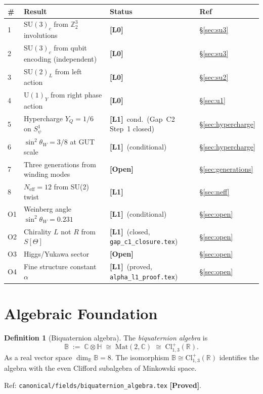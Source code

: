 \documentclass[12pt,a4paper]{article}
\theoremstyle{definition}
\newtheorem{definition}[theorem]{Definition}
\theoremstyle{remark}
\newcommand{\PROVED}{\textbf{[Proved]}}
\newcommand{\OPEN}{\textbf{[Open]}}
\newcommand{\SU}[1]{\mathrm{SU}(#1)}
\newcommand{\UU}[1]{\mathrm{U}(#1)}
\newcommand{\Bq}{\mathbb{C}\otimes\mathbb{H}}
\newcommand{\Lone}{\textbf{[L1]}}
\newcommand{\Lzero}{\textbf{[L0]}}
\begin{document}
\begin{center}
\begin{tabular}{llll}
\toprule
\textbf{\#} & \textbf{Result} & \textbf{Status} & \textbf{Ref} \\
\midrule
1 & $\SU{3}_c$ from $\mathbb{Z}_2^3$ involutions & \Lzero & §\ref{sec:su3} \\
2 & $\SU{3}_c$ from qubit encoding (independent) & \Lzero & §\ref{sec:su3} \\
3 & $\SU{2}_L$ from left action & \Lzero & §\ref{sec:su2} \\
4 & $\UU{1}_Y$ from right phase action & \Lzero & §\ref{sec:u1} \\
5 & Hypercharge $Y_Q = 1/6$ on $S^1_\psi$ & \Lone\ cond.\ (Gap~C2 Step~1 closed) & §\ref{sec:hypercharge} \\
6 & $\sin^2\theta_W = 3/8$ at GUT scale & \Lone\ (conditional) & §\ref{sec:hypercharge} \\
7 & Three generations from winding modes & \OPEN & §\ref{sec:generations} \\
8 & $N_{\mathrm{eff}} = 12$ from SU(2) twist & \Lone & §\ref{sec:neff} \\
\midrule
O1 & Weinberg angle $\sin^2\theta_W = 0.231$ & \Lone\ (conditional) & §\ref{sec:open} \\
O2 & Chirality $L$ not $R$ from $S[\Theta]$ & \Lone\ (closed, \texttt{gap\_c1\_closure.tex}) & §\ref{sec:open} \\
O3 & Higgs/Yukawa sector & \OPEN & §\ref{sec:open} \\
O4 & Fine structure constant $\alpha$ & \Lone\ (proved, \texttt{alpha\_l1\_proof.tex}) & §\ref{sec:open} \\
\bottomrule
\end{tabular}
\end{center}

\section{Algebraic Foundation}
\label{sec:algebra}

\begin{definition}[Biquaternion algebra]
\label{def:biquaternion}
The \emph{biquaternion algebra} is
\[
  \mathbb{B} \;:=\; \Bq \;\cong\; \mathrm{Mat}(2,\mathbb{C})
 \;\cong\; \mathrm{Cl}^{+}_{1,3}(\mathbb{R}).
\]
As a real vector space $\dim_\mathbb{R}\mathbb{B} = 8$.
The isomorphism $\mathbb{B}\cong\mathrm{Cl}^{+}_{1,3}(\mathbb{R})$ identifies
the algebra with the even Clifford subalgebra of Minkowski space.

Ref: \texttt{canonical/fields/biquaternion\_algebra.tex} \PROVED.
\end{definition}
\end{document}
